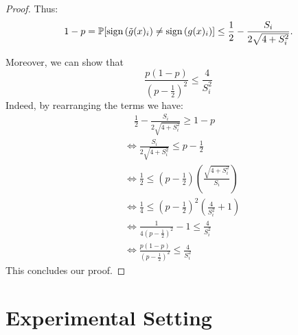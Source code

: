 \begin{proof}
Thus:
\begin{equation*}
    1 - p = \mathbb{P}[\textnormal{sign}\left(\tilde{g}(x)_i\right) \neq \textnormal{sign}\left(g(x)_i\right)] \leq \frac{1}{2} - \frac{S_i}{2\sqrt{4 + S_i^2}}.
\end{equation*}

Moreover, we can show that
\begin{equation*}
    \frac{p(1 - p)}{(p - \frac{1}{2})^2} \leq \frac{4}{S_i^2}
\end{equation*}
Indeed, by rearranging the terms we have:
\begin{align*}
& \quad \frac{1}{2} - \frac{S_i}{2 \sqrt{4 + S_i^2}} \geq 1 - p \\
&\iff  \frac{S_i}{2 \sqrt{4 + S_i^2}}\leq p - \frac{1}{2} \\
&\iff  \frac{1}{2}\leq (p - \frac{1}{2})(\frac{\sqrt{4 + S_i^2}}{S_i}) \\
&\iff \frac{1}{4} \leq (p - \frac{1}{2})^2(\frac{4}{S_i^2} + 1) \\
&\iff \frac{1}{4(p - \frac{1}{2})^2} - 1 \leq \frac{4}{S_i^2} \\
&\iff \frac{p(1 - p)}{(p - \frac{1}{2})^2} \leq \frac{4}{S_i^2} 
\end{align*}
This concludes our proof.



\end{proof}

\newpage

\section{Experimental Setting}
\label{experimental_setting}

